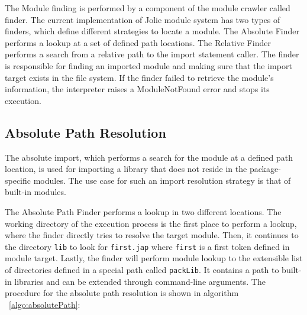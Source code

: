 The Module finding is performed by a component of the module crawler called finder. The current implementation of Jolie module system has two types of finders, which define different strategies to locate a module. The Absolute Finder performs a lookup at a set of defined path locations. The Relative Finder performs a search from a relative path to the import statement caller. The finder is responsible for finding an imported module and making sure that the import target exists in the file system. If the finder failed to retrieve the module's information, the interpreter raises a ModuleNotFound error and stops its execution.

\subsection{ Absolute Path Resolution }

The absolute import, which performs a search for the module at a defined path location, is used for importing a library that does not reside in the package-specific modules. The use case for such an import resolution strategy is that of built-in modules.

The Absolute Path Finder performs a lookup in two different locations. The working directory of the execution process is the first place to perform a lookup, where the finder directly tries to resolve the target module. Then, it continues to the directory \texttt{lib} to look for \texttt{first.jap} where \texttt{first} is a first token defined in module target. Lastly, the finder will perform module lookup to the extensible list of directories defined in a special path called \texttt{packLib}. It contains a path to built-in libraries and can be extended through command-line arguments. The procedure for the absolute path resolution is shown in algorithm ~\ref{algo:absolutePath}:

